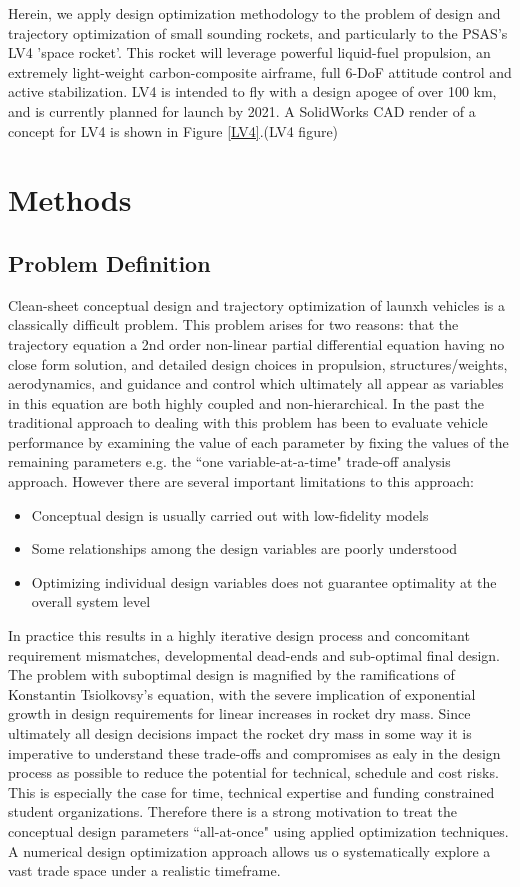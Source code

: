 \documentclass[]{aiaa-tc}%
\begin{document}
Herein, we apply design optimization methodology to the problem of design and trajectory optimization of small sounding rockets, and particularly to the PSAS's LV4 'space rocket'. This rocket will leverage powerful liquid-fuel propulsion, an extremely light-weight carbon-composite airframe, full 6-DoF attitude control and active stabilization. LV4 is intended to fly with a design apogee of over 100 km, and is currently planned for launch by 2021. A SolidWorks CAD render of a concept for LV4 is shown in Figure \ref{LV4}.(LV4 figure)

\section{Methods}
\subsection{Problem Definition}
Clean-sheet conceptual design and trajectory optimization of launxh vehicles is a classically difficult problem. This problem arises for two reasons: that the trajectory equation a 2nd order non-linear partial differential equation having no close form solution, and detailed design choices in propulsion, structures/weights, aerodynamics, and guidance and control which ultimately all appear as variables in this equation are both highly coupled and non-hierarchical. In the past the traditional approach to dealing with this problem has been to evaluate vehicle performance by examining the value of each parameter by fixing the values of the remaining parameters e.g. the ``one variable-at-a-time" trade-off analysis approach. However there are several important limitations to this approach:
\begin{itemize}
\item Conceptual design is usually carried out with low-fidelity models
\item Some relationships among the design variables are poorly understood
\item Optimizing individual design variables does not guarantee optimality at the overall system level
\end{itemize}

In practice this results in a highly iterative design process and concomitant requirement mismatches, developmental dead-ends and sub-optimal final design. The problem with suboptimal design is magnified by the ramifications of Konstantin Tsiolkovsy's equation, with the severe implication of exponential growth in design requirements for linear increases in rocket dry mass. Since ultimately all design decisions impact the rocket dry mass in some way it is imperative to understand these trade-offs and compromises as ealy in the design process as possible to reduce the potential for technical, schedule and cost risks. This is especially the case for time, technical expertise and funding constrained student organizations. Therefore there is a strong motivation to treat the conceptual design parameters ``all-at-once" using applied optimization techniques. A numerical design optimization approach allows us o systematically explore a vast trade space under a realistic timeframe.
\end{document}
